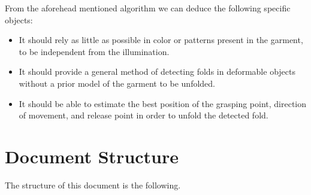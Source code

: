 From the aforehead mentioned algorithm we can deduce the following specific objects:

\begin{itemize}
	\item It should rely as little as possible in color or patterns present in the garment, to be independent from the illumination.
	\item It should provide a general method of detecting folds in deformable objects without a prior model of the garment to be unfolded.
	\item It should be able to estimate the best position of the grasping point, direction of movement, and release point in order to unfold the detected fold.
\end{itemize}


\section{Document Structure}
\label{intro_structure}

The structure of this document is the following. 

